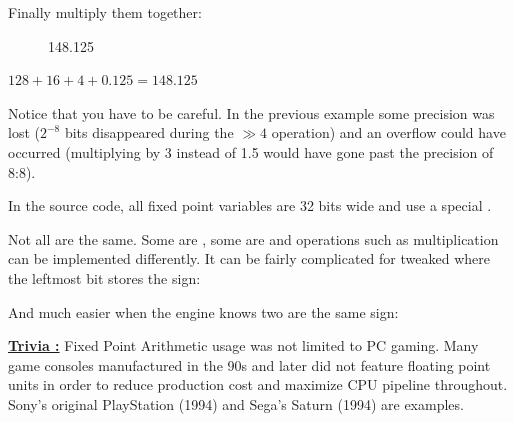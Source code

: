Finally multiply them together:

\begin{figure}[H]
 \centering
   
   \caption{148.125} 
\end{figure} 
$128 + 16 + 4 + 0.125 = 148.125 $\\
\par
Notice that you have to be careful. In the previous example some precision was lost ($ 2^{-8}$ bits disappeared during the $\gg 4$ operation) and an overflow could have occurred (multiplying by 3 instead of 1.5 would have gone past the precision of 8:8).\\
\par
In the source code, all fixed point variables are 32 bits wide and use a special .\\
\par
\begin{minipage}{\textwidth}
 
 \end{minipage}
\par
Not all  are the same. Some are , some are  and operations such as multiplication can be implemented differently. It can be fairly complicated for tweaked  where the leftmost bit stores the sign:\\
\par
\begin{minipage}{\textwidth}
 
 \end{minipage}
\par
And much easier when the engine knows two  are the same sign:\\

\par
\begin{minipage}{\textwidth}
 
 \end{minipage}
\par

 \textbf{\underline{Trivia :}}  Fixed Point Arithmetic usage was not limited to PC gaming. Many game consoles manufactured in the 90s and later did not feature floating point units in order to reduce production cost and maximize CPU pipeline throughout. Sony's original PlayStation (1994) and Sega's Saturn (1994) are examples.
 

 
 


